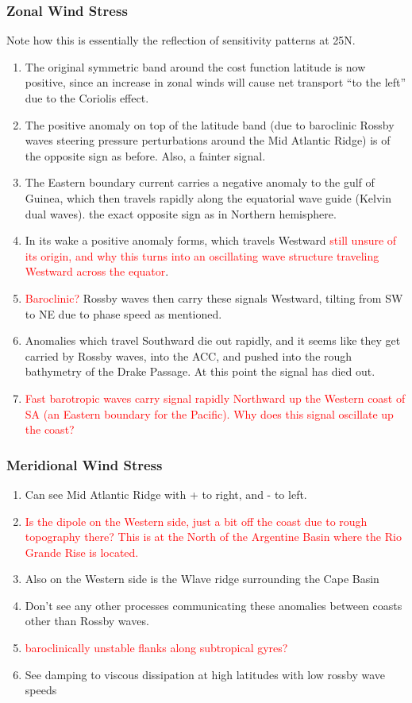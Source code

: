 \documentclass[a4paper,11pt]{article}
\newcommand{\red}[1]{\textcolor{red}{#1}}
\begin{document}
   \subsubsection{Zonal Wind Stress}
	Note how this is essentially the reflection of sensitivity patterns at 25N. 
    \begin{enumerate}
	\item The original symmetric band around the cost function latitude is now positive, since an increase in zonal winds will cause net transport ``to the left'' due to the Coriolis effect. 
	\item The positive anomaly on top of the latitude band (due to baroclinic Rossby waves steering pressure perturbations around the Mid Atlantic Ridge) is of the opposite sign as before. Also, a fainter signal. 
	\item The Eastern boundary current carries a negative anomaly to the gulf of Guinea, which then travels rapidly along the equatorial wave guide (Kelvin dual waves). the exact opposite sign as in Northern hemisphere.
	\item In its wake a positive anomaly forms, which travels Westward \red{still unsure of its origin, and why this turns into an oscillating wave structure traveling Westward across the equator}. 
	\item \red{Baroclinic?} Rossby waves then carry these signals Westward, tilting from SW to NE due to phase speed as mentioned.
	\item Anomalies which travel Southward die out rapidly, and it seems like they get carried by Rossby waves, into the ACC, and pushed into the rough bathymetry of the Drake Passage. At this point the signal has died out. 
	\item \red{Fast barotropic waves carry signal rapidly Northward up the Western coast of SA (an Eastern boundary for the Pacific). Why does this signal oscillate up the coast?} 
    \end{enumerate}
   \subsubsection{Meridional Wind Stress}
    \begin{enumerate}
	\item Can see Mid Atlantic Ridge with + to right, and - to left. 
	\item \red{Is the dipole on the Western side, just a bit off the coast due to rough topography there? This is at the North of the Argentine Basin where the Rio Grande Rise is located.}
	\item Also on the Western side is the Wlave ridge surrounding the Cape Basin
	\item Don't see any other processes communicating these anomalies between coasts other than Rossby waves. 
	\item \red{baroclinically unstable flanks along subtropical gyres?}
	\item See damping to viscous dissipation at high latitudes with low rossby wave speeds
    \end{enumerate} 
\end{document}
